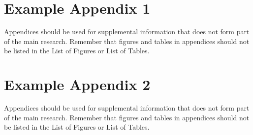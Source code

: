 \documentclass{imc-inf}
\begin{document}
\begin{appendices} %
\chapter{Example Appendix 1}

Appendices should be used for supplemental information that does not form part of the main research. Remember that figures and tables in appendices should not be listed in the List of Figures or List of Tables. 

\chapter{Example Appendix 2}

Appendices should be used for supplemental information that does not form part of the main research. Remember that figures and tables in appendices should not be listed in the List of Figures or List of Tables. 
	
\end{appendices}
\end{document}
